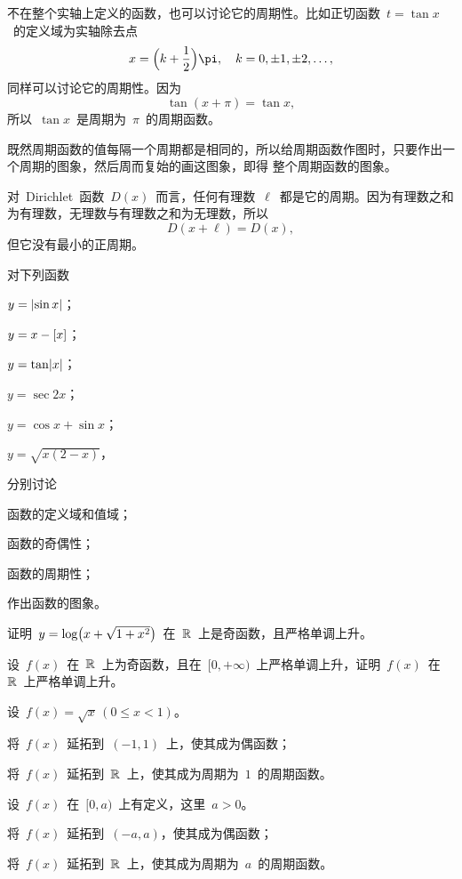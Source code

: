 不在整个实轴上定义的函数，也可以讨论它的周期性。比如正切函数~$t=\tan x$~的定义域为实轴除去点
\[
  x=\Paren[\Big]{k+\frac12}\pi,\quad k=0,\pm1,\pm2,\dotsc,
\]
同样可以讨论它的周期性。因为
\[
  \tan(x+\pi)=\tan x,
\]
所以~$\tan x$~是周期为~$\pi$~的周期函数。

既然周期函数的值每隔一个周期都是相同的，所以给周期函数作图时，只要作出一个周期的图象，然后周而复始的画这图象，即得
整个周期函数的图象。

对~Dirichlet~函数~$D(x)$~而言，任何有理数~$\ell$~都是它的周期。因为有理数之和为有理数，无理数与有理数之和为无理数，所以
\[
  D(x+\ell)=D(x),
\]
但它没有最小的正周期。

\begin{exercise}
\item 对下列函数
\begin{exlistcols}[3]
  \item $y=\lvert\sin x\rvert$；
  \item $y=x-\lbrack x\rbrack$；
  \item $y=\tan\lvert x\rvert$；
  \item $y=\sec 2x$；
  \item $y=\cos x+\sin x$；
  \item $y=\sqrt{x(2-x)}$，
\end{exlistcols}
分别讨论
\begin{exlistcols}
  \item 函数的定义域和值域；
  \item 函数的奇偶性；
  \item 函数的周期性；
  \item 作出函数的图象。
\end{exlistcols}
\item 证明~$y=\log\bigl\lparen x+\sqrt{1+x^2}\bigr\rparen$~在~$\mathbb{R}$~上是奇函数，且严格单调上升。
\item 设~$f(x)$~在~$\mathbb{R}$~上为奇函数，且在~$[0,+\infty)$~上严格单调上升，证明~$f(x)$~在~$\mathbb{R}$~上严格单调上升。
\item 设~$f(x)=\sqrt x\,(0\leq x<1)$。
\begin{exlist}
  \item 将~$f(x)$~延拓到~$(-1,1)$~上，使其成为偶函数；
  \item 将~$f(x)$~延拓到~$\mathbb{R}$~上，使其成为周期为~$1$~的周期函数。
\end{exlist}
\item 设~$f(x)$~在~$[0,a)$~上有定义，这里~$a>0$。
\begin{exlist}
  \item 将~$f(x)$~延拓到~$(-a,a)$，使其成为偶函数；
  \item 将~$f(x)$~延拓到~$\mathbb{R}$~上，使其成为周期为~$a$~的周期函数。

\end{exlist}
\end{exercise}
